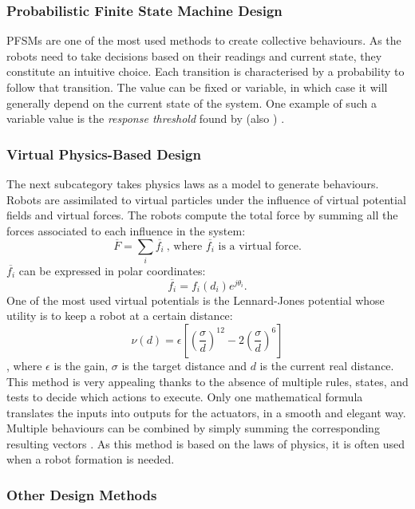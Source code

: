 \documentclass[a4paper, 12pt]{report}
\begin{document}
			\subsubsection{Probabilistic Finite State Machine Design}
			
			PFSMs \citep{minsky1967computation} are one of the most used methods to create collective behaviours. As the robots need to take decisions based on their readings and current state, they constitute an intuitive choice. Each transition is characterised by a probability to follow that transition. The value can be fixed or variable, in which case it will generally depend on the current state of the system. One example of such a variable value is the \emph{response threshold} found by \citet{granovetter1978threshold} (also \citet{bonabeau1997adaptive}) .
			
			\subsubsection{Virtual Physics-Based Design}
			
			The next subcategory takes physics laws as a model to generate behaviours. Robots are assimilated to virtual particles under the influence of virtual potential fields and virtual forces. The robots compute the total force by summing all the forces associated to each influence in the system:
			$$\overline{F} = \sum_{i}{\overline{f_i}} ~\mbox{, where $\overline{f_i}$ is a virtual force.}$$
			$\overline{f_i}$ can be expressed in polar coordinates: $$\overline{f_i} = f_i(d_i)e^{j\theta_i}.$$ 
			One of the most used virtual potentials is the Lennard-Jones potential whose utility is to keep a robot at a certain distance: 
			$$ \nu(d) = \epsilon \left[ \left(\frac{\sigma}{d}\right)^{12} - 2 \left(\frac{\sigma}{d}\right)^6 \right]$$, where $\epsilon$ is the gain, $\sigma$ is the target distance and $d$ is the current real distance. 
			This method is very appealing thanks to the absence of multiple rules, states, and tests to decide which actions to execute. Only one mathematical formula translates the inputs into outputs for the actuators, in a smooth and elegant way. Multiple behaviours can be combined by simply summing the corresponding resulting vectors \citep{brambilla2013swarm}. As this method is based on the laws of physics, it is often used when a robot formation is needed.
			
			\subsubsection{Other Design Methods}
		
\end{document}
